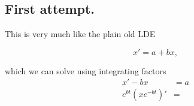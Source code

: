 %
%
%
%
%
%
%
%
%
%

\subsection{First attempt.}

This is very much like the plain old LDE

\begin{equation}\label{eqn:lorentzRotation:300}
x' = a + b x,
\end{equation}

which we can solve using integrating factors
\begin{align*}
x' - b x &= a \\
e^{b t} \left( x e^{-b t} \right)' &=
\end{align*}

